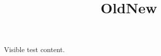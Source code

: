 \documentclass[paper=A4]{ropas-poster}
\title{Old}\title{New}
\begin{document}
Visible test content.
\end{document}
